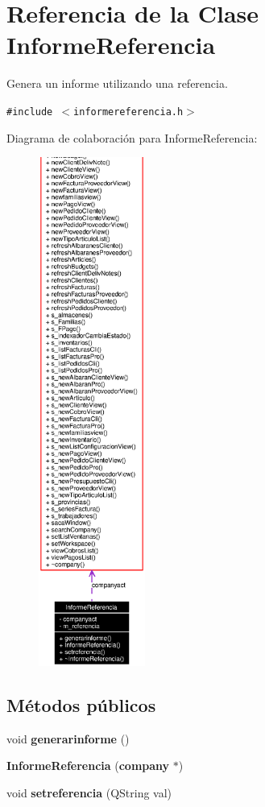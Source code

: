\section{Referencia de la Clase Informe\-Referencia}
\label{classInformeReferencia}
Genera un informe utilizando una referencia.  


{\tt \#include $<$informereferencia.h$>$}

Diagrama de colaboraci\'{o}n para Informe\-Referencia:\begin{figure}[H]
\begin{center}
\leavevmode
\includegraphics[width=99pt]{classInformeReferencia__coll__graph}
\end{center}
\end{figure}
\subsection*{M\'{e}todos p\'{u}blicos}
\begin{CompactItemize}
\item 
void {\bf generarinforme} ()
\item 
{\bf Informe\-Referencia} ({\bf company} $\ast$)\label{classInformeReferencia_a1}

\item 
void {\bf setreferencia} (QString val)\label{classInformeReferencia_a2}

\end{CompactItemize}



